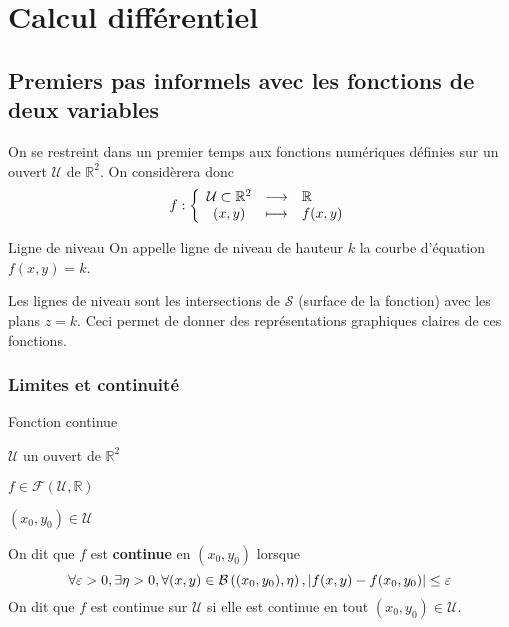 
\section{Calcul différentiel}

\subsection{Premiers pas informels avec les fonctions de deux variables}

    On se restreint dans un premier temps aux fonctions numériques définies sur un ouvert $\mathcal{U}$ de $\mathbb{R}^2$. On considèrera donc 
    \[ \fonction{f}{\mathcal{U} \subset \mathbb{R}^2}{\mathbb{R}}{(x,y)}{f(x,y)} \]   

    \begin{defi}{Ligne de niveau}{}
        On appelle ligne de niveau de hauteur $k$ la courbe d’équation $f(x,y) = k$. 
    \end{defi}

    Les lignes de niveau sont les intersections de $\mathcal{S}$ (surface de la fonction) avec les plans $z = k$. Ceci permet de donner des représentations graphiques claires de ces fonctions.

    \subsubsection{Limites et continuité}

    \begin{defi}{Fonction continue}{}
        \begin{soient}
            \item $\mathcal{U}$ un ouvert de $\mathbb{R}^2$
            \item $f \in \mathcal{F}(\mathcal{U},\mathbb{R})$
            \item $(x_0,y_0) \in \mathcal{U}$
        \end{soient}
        On dit que $f$ est \textbf{continue} en $(x_0,y_0)$ lorsque 
        \[ \forall \varepsilon > 0,  \exists \eta > 0,  \forall(x,y) \in \mathcal{B}\left((x_0,y_0),\eta\right),  \left\lvert f(x,y)-f(x_0,y_0)\right\rvert \leq \varepsilon \]
        On dit que $f$ est continue sur $\mathcal{U}$ si elle est continue en tout $(x_0,y_0) \in \mathcal{U}$.
    \end{defi}


